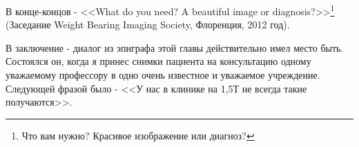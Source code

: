 В конце-концов - <<What do you need? A beautiful image or diagnosis?>>\footnote{Что вам нужно? Красивое изображение или диагноз?} (Заседание Weight Bearing Imaging Society, Флоренция, 2012 год).

В заключение - диалог из эпиграфа этой главы действительно имел место быть. Состоялся он, когда я принес снимки пациента на консультацию одному уважаемому профессору в одно очень известное и уважаемое учреждение. Следующей фразой было - <<У нас в клинике на 1,5Т не всегда такие получаются>>. 